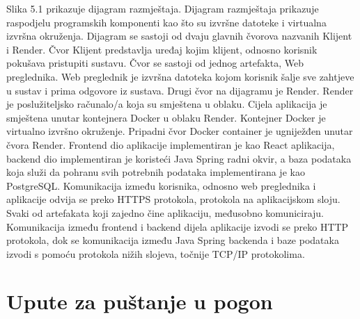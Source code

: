			 \newpage
			 
			 Slika 5.1 prikazuje dijagram razmještaja. Dijagram razmještaja prikazuje raspodjelu programskih komponenti kao što su izvršne datoteke i virtualna izvršna okruženja. Dijagram se sastoji od dvaju glavnih čvorova nazvanih Klijent i Render. Čvor Klijent predstavlja uređaj kojim klijent, odnosno korisnik pokušava pristupiti sustavu. Čvor se sastoji od jednog artefakta, Web preglednika. Web preglednik je izvršna datoteka kojom korisnik šalje sve zahtjeve u sustav i prima odgovore iz sustava. Drugi čvor na dijagramu je Render. Render je poslužiteljsko računalo/a koja su smještena u oblaku. Cijela aplikacija je smještena unutar kontejnera Docker u oblaku Render. Kontejner Docker je virtualno izvršno okruženje. Pripadni čvor Docker container je ugniježđen unutar čvora Render. Frontend dio aplikacije implementiran je kao React aplikacija, backend dio implementiran je koristeći Java Spring radni okvir, a baza podataka koja služi da pohranu svih potrebnih podataka implementirana je kao PostgreSQL. Komunikacija između korisnika, odnosno web preglednika i aplikacije odvija se preko HTTPS protokola, protokola na aplikacijskom sloju. Svaki od artefakata koji zajedno čine aplikaciju, međusobno komuniciraju. Komunikacija između frontend i backend dijela aplikacije izvodi se preko HTTP protokola, dok se komunikacija između Java Spring backenda i baze podataka izvodi s pomoću protokola nižih slojeva, točnije TCP/IP protokolima.
			
			\eject 
		
		\section{Upute za puštanje u pogon}
		
		
			
			
			
			
			\eject 